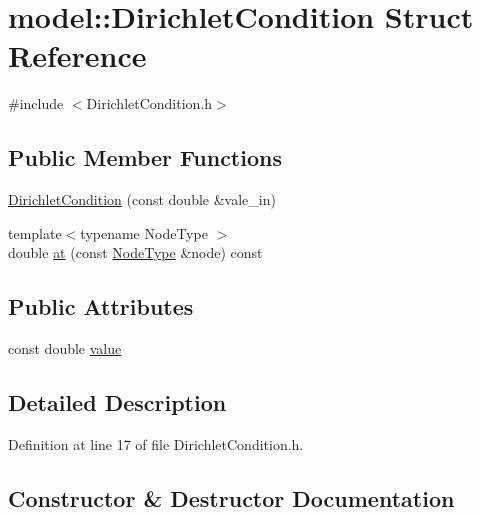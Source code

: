 \hypertarget{structmodel_1_1_dirichlet_condition}{}\section{model\+:\+:Dirichlet\+Condition Struct Reference}
\label{structmodel_1_1_dirichlet_condition}


{\ttfamily \#include $<$Dirichlet\+Condition.\+h$>$}

\subsection*{Public Member Functions}
\begin{DoxyCompactItemize}
\item 
\hyperlink{structmodel_1_1_dirichlet_condition_aad6aa98bae281e97af6a5f6d0923bdc3}{Dirichlet\+Condition} (const double \&vale\+\_\+in)
\item 
{\footnotesize template$<$typename Node\+Type $>$ }\\double \hyperlink{structmodel_1_1_dirichlet_condition_ada1282f56b91822e97b0cbb1887a5eca}{at} (const \hyperlink{_network_typedefs_8h_a723f680c66f6a92647827790bcbafce0}{Node\+Type} \&node) const 
\end{DoxyCompactItemize}
\subsection*{Public Attributes}
\begin{DoxyCompactItemize}
\item 
const double \hyperlink{structmodel_1_1_dirichlet_condition_aa7cecfba4f047a67dd75473c882596fe}{value}
\end{DoxyCompactItemize}


\subsection{Detailed Description}


Definition at line 17 of file Dirichlet\+Condition.\+h.



\subsection{Constructor \& Destructor Documentation}
\hypertarget{structmodel_1_1_dirichlet_condition_aad6aa98bae281e97af6a5f6d0923bdc3}{}
